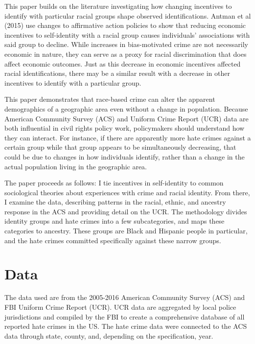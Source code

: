 \documentclass{article}
\begin{document}
    This paper builds on the literature investigating how changing incentives to identify with particular racial groups shape observed identifications. Antman et al (2015) use changes to affirmative action policies to show that reducing economic incentives to self-identity with a racial group causes individuals' associations with said group to decline. While increases in bias-motivated crime are not necessarily economic in nature, they can serve as a proxy for racial discrimination that does affect economic outcomes. Just as this decrease in economic incentives affected racial identifications, there may be a similar result with a decrease in other incentives to identify with a particular group.
    
    This paper demonstrates that race-based crime can alter the apparent demographics of a geographic area even without a change in population. Because American Community Survey (ACS) and Uniform Crime Report (UCR) data are both influential in civil rights policy work, policymakers should understand how they can interact. For instance, if there are apparently more hate crimes against a certain group while that group appears to be simultaneously decreasing, that could be due to changes in how individuals identify, rather than a change in the actual population living in the geographic area.
    
    The paper proceeds as follows: I tie incentives in self-identity to common sociological theories about experiences with crime and racial identity. From there, I examine the data, describing patterns in the racial, ethnic, and ancestry response in the ACS and providing detail on the UCR. The methodology divides identity groups and hate crimes into a few subcategories, and maps these categories to ancestry. These groups are Black and Hispanic people in particular, and the hate crimes committed specifically against these narrow groups.

\section{Data}

    The data used are from the 2005-2016 American Community Survey (ACS) and FBI Uniform Crime Report (UCR). UCR data are aggregated by local police jurisdictions and compiled by the FBI to create a comprehensive database of all reported hate crimes in the US. The hate crime data were connected to the ACS data through state, county, and, depending on the specification, year. 
    
\end{document}
